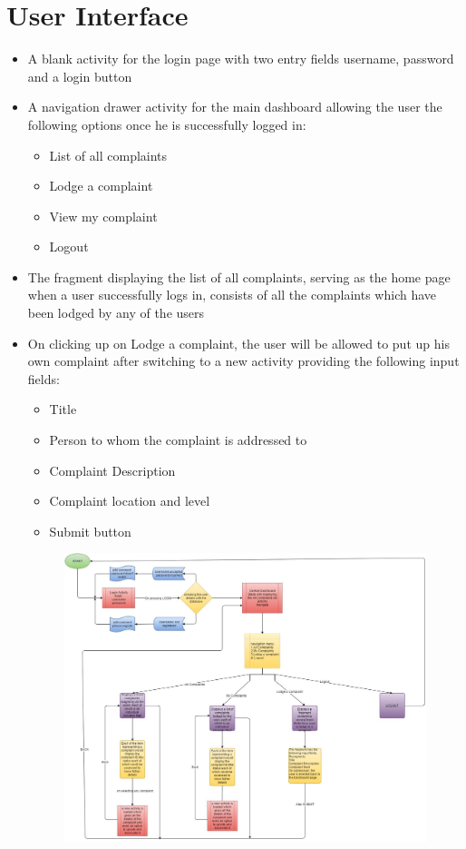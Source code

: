 \documentclass[12pt]{article}
\begin{document}
\section{User Interface}
\begin{itemize}
\item A  blank activity for the login page with two entry fields username, password and a login button
\item A navigation drawer activity for the main dashboard allowing the user the following options once he is successfully logged in:
	\begin{itemize}
		\color{blue}
		\item List of all complaints
		\item Lodge a complaint
		\item View my complaint
		\item Logout 
	\end{itemize}
 \item The fragment displaying the list of all complaints, serving as the home page when a user successfully logs in, consists of all the complaints which have been lodged by any of the users
\item On clicking up on Lodge a complaint, the user will be allowed to put up his own complaint after switching to a new activity providing the following input fields:
	\begin{itemize}
		\color{blue}
		\item Title
		\item Person to whom the complaint is addressed to
		\item Complaint Description 
		\item Complaint location and level
		\item Submit button
	\end{itemize}
\begin{figure}[ht!]
\includegraphics[width=150mm]{workflow.jpg}

\end{figure}
\end{itemize}
\end{document}
